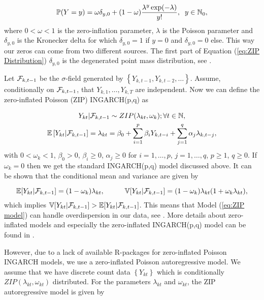 \begin{equation}
\mathbb{P}(Y=y) = \omega \delta_{y,0}+ (1-\omega) \frac{\lambda^y \exp(-\lambda)}{y!}, \hspace{0.2cm} y \in \mathbb{N}_0,
\label{eq:ZIP Distribution}
\end{equation}
%
where $0 < \omega < 1$ is the zero-inflation parameter, $\lambda$ is the Poisson parameter and $\delta_{y,0}$ is the Kronecker delta for which $\delta_{y,0}=1$ if $y=0$ and $\delta_{y,0}=0$ else. This way our zeros can come from two different sources. The first part of Equation (\ref{eq:ZIP Distribution}) $\delta_{y,0}$ is the degenerated point mass distribution, see \textcite{Zhu:2012}.

Let $\mathcal{F}_{k,t-1}$ be the $\sigma$-field generated by $\left\{Y_{k,t-1},Y_{k,t-2},\ldots\right\}$. Assume, conditionally on $\mathcal{F}_{k,t-1}$, that $Y_{k,1},\ldots,Y_{k,T}$ are independent. Now we can define the zero-inflated Poisson (ZIP) INGARCH(p,q) as

\begin{equation}
\begin{gathered}
\label{eq:ZIP model}
Y_{kt} | \mathcal{F}_{k,t-1} \sim ZIP(\lambda_{kt},\omega_k); \forall t \in \mathbb{N}, \\
\mathbb{E}\left[Y_{kt} | \mathcal{F}_{k,t-1} \right] = \lambda_{kt} = \beta_0 + \sum_{i=1}^p\beta_i Y_{k,t-i} + \sum_{j=1}^q\alpha_j \lambda_{k,t-j},
\end{gathered}
\end{equation}
%
with $0<\omega_k<1$, $\beta_0>0$, $\beta_i\geq 0$, $\alpha_j \geq 0$ for $i=1,\ldots,p$, $j=1,\ldots,q$, $p\geq 1$, $q\geq 0$. If $\omega_k =0$ then we get the standard INGARCH(p,q) model discussed above. It can be shown that the conditional mean and variance are given by

\begin{equation}
\mathbb{E}[Y_{kt} | \mathcal{F}_{k,t-1}] = (1-\omega_k)\lambda_{kt}, \hspace{1cm} \mathbb{V}[Y_{kt} | \mathcal{F}_{k,t-1}] =(1-\omega_k)\lambda_{kt}(1+\omega_k \lambda_{kt}),
\label{eq:Conditional Mean and Variance ZIP}
\end{equation}
%
which implies $ \mathbb{V}[Y_{kt} | \mathcal{F}_{k,t-1}] > \mathbb{E}[Y_{kt} | \mathcal{F}_{k,t-1}]$. This means that Model (\ref{eq:ZIP model}) can handle overdispersion in our data, see \textcite{Zhu:2012}. More details about zero-inflated models and especially the zero-inflated INGARCH(p,q) model can be found in \textcite{Zhu:2012}.

However, due to a lack of available R-packages for zero-inflated Poisson INGARCH models, we use a zero-inflated Poisson autoregressive model. We assume that we have discrete count data $\left\{Y_{kt}\right\}$ which is conditionally $ZIP(\lambda_{kt},\omega_{kt})$ distributed. For the parameters $\lambda_{kt}$ and $\omega_{kt}$, the ZIP autoregressive model is given by 

